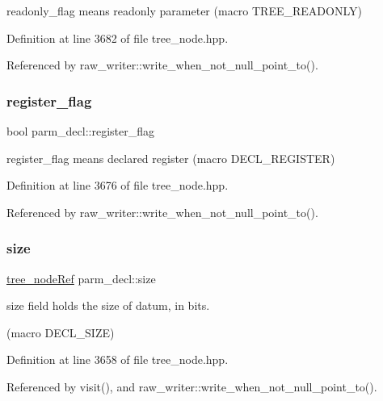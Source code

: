 readonly\+\_\+flag means readonly parameter (macro T\+R\+E\+E\+\_\+\+R\+E\+A\+D\+O\+N\+LY) 



Definition at line 3682 of file tree\+\_\+node.\+hpp.



Referenced by raw\+\_\+writer\+::write\+\_\+when\+\_\+not\+\_\+null\+\_\+point\+\_\+to().

\mbox{\label{structparm__decl_afa8d0ea86bc201652dbc25f9d5a29710}} 
\subsubsection{\texorpdfstring{register\+\_\+flag}{register\_flag}}
{\footnotesize\ttfamily bool parm\+\_\+decl\+::register\+\_\+flag}



register\+\_\+flag means declared \textquotesingle{}register\textquotesingle{} (macro D\+E\+C\+L\+\_\+\+R\+E\+G\+I\+S\+T\+ER) 



Definition at line 3676 of file tree\+\_\+node.\+hpp.



Referenced by raw\+\_\+writer\+::write\+\_\+when\+\_\+not\+\_\+null\+\_\+point\+\_\+to().

\mbox{\label{structparm__decl_a57a75a7d074eab815fa211c843007d07}} 
\subsubsection{\texorpdfstring{size}{size}}
{\footnotesize\ttfamily \hyperlink{tree__node_8hpp_a6ee377554d1c4871ad66a337eaa67fd5}{tree\+\_\+node\+Ref} parm\+\_\+decl\+::size}



size field holds the size of datum, in bits. 

(macro D\+E\+C\+L\+\_\+\+S\+I\+ZE) 

Definition at line 3658 of file tree\+\_\+node.\+hpp.



Referenced by visit(), and raw\+\_\+writer\+::write\+\_\+when\+\_\+not\+\_\+null\+\_\+point\+\_\+to().

